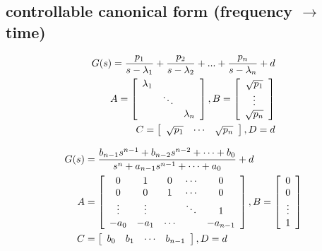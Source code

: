 \subsection{controllable canonical form (frequency $\rightarrow$ time)}
\begin{align*}
    G(s) = \frac{p_1}{s-\lambda_1} + \frac{p_2}{s-\lambda_2} + ... + \frac{p_n}{s-\lambda_n} + d\\
    A = \left[\begin{array}{c c c}
        \lambda_1 & & \\
         & \ddots & \\
         & & \lambda_n
    \end{array}\right]
    ,
    B = \left[\begin{array}{c}
        \sqrt{p_1}\\
        \vdots\\
        \sqrt{p_n}
    \end{array}\right]
    \\
    C = \left[\begin{array}{c c c}
        \sqrt{p_1} & \cdots & \sqrt{p_n}
    \end{array}\right]
    ,
    D = d
\end{align*}

\begin{align*}
    G(s) &= \frac{b_{n-1}s^{n-1} + b_{n-2}s^{n-2} + \dots + b_0}{s^n + a_{n-1}s^{n-1} + \dots + a_0} + d\\
    A &= \left[\begin{array}{c c c c c}
        0 & 1 & 0 & \cdots & 0\\
        0 & 0 & 1 & \cdots & 0\\
        \vdots & \vdots & & \ddots & 1\\
        -a_0 & -a_1 & \cdots & & -a_{n-1}
    \end{array}\right]
    ,
    B = \left[\begin{array}{c}
        0\\
        0\\
        \vdots\\
        1
    \end{array}\right]
    \\
    C &= \left[\begin{array}{c c c c}
        b_0 & b_1 & \cdots & b_{n-1}
    \end{array}\right]
    ,
    D = d
\end{align*}